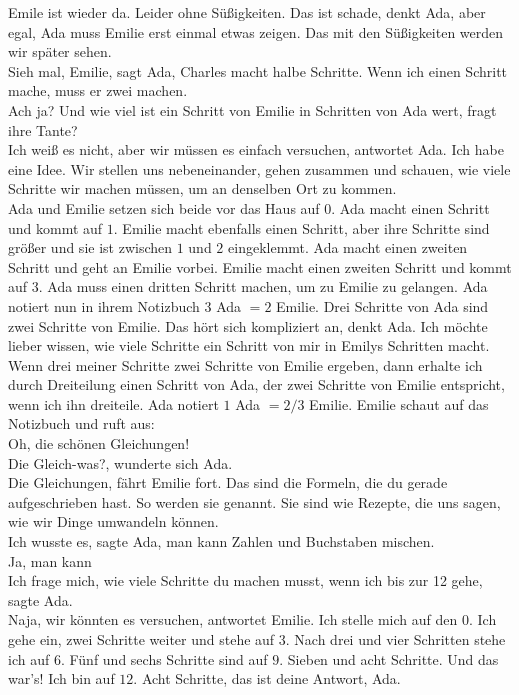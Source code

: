 Emile ist wieder da. Leider ohne Süßigkeiten. Das ist schade, denkt Ada, aber egal, Ada muss Emilie erst einmal etwas zeigen. Das mit den Süßigkeiten werden wir später sehen.\\
\frqq{}Sieh mal, Emilie\flqq{}, sagt Ada, \frqq{}Charles macht halbe Schritte. Wenn ich einen Schritt mache, muss er zwei machen.\flqq{}\\
\frqq{}Ach ja? Und wie viel ist ein Schritt von Emilie in Schritten von Ada wert, fragt ihre Tante?\flqq{}\\
\frqq{}Ich weiß es nicht, aber wir müssen es einfach versuchen\flqq{}, antwortet Ada. \frqq{}Ich habe eine Idee. Wir stellen uns nebeneinander, gehen zusammen und schauen, wie viele Schritte wir machen müssen, um an denselben Ort zu kommen.\flqq{}\\
Ada und Emilie setzen sich beide vor das Haus auf $0$. Ada macht einen Schritt und kommt auf $1$. Emilie macht ebenfalls einen Schritt, aber ihre Schritte sind größer und sie ist zwischen $1$ und $2$ eingeklemmt.
Ada macht einen zweiten Schritt und geht an Emilie vorbei. Emilie macht einen zweiten Schritt und kommt auf $3$.  Ada muss einen dritten Schritt machen, um zu Emilie zu gelangen.
Ada notiert nun in ihrem Notizbuch $3$ Ada $= 2$ Emilie. Drei Schritte von Ada sind zwei Schritte von Emilie. Das hört sich kompliziert an, denkt Ada. Ich möchte lieber wissen, wie viele Schritte ein Schritt von mir in Emilys Schritten macht. Wenn drei meiner Schritte zwei Schritte von Emilie ergeben, dann erhalte ich durch Dreiteilung einen Schritt von Ada, der zwei Schritte von Emilie entspricht, wenn ich ihn dreiteile. Ada notiert $1$ Ada $= 2/3$ Emilie.
Emilie schaut auf das Notizbuch und ruft aus: \\
\frqq{}Oh, die schönen Gleichungen!\flqq{}\\
\frqq{}Die Gleich-was?\flqq{}, wunderte sich Ada.\\
\frqq{}Die Gleichungen\flqq{}, fährt Emilie fort. \frqq{}Das sind die Formeln, die du gerade aufgeschrieben hast. So werden sie genannt. Sie sind wie Rezepte, die uns sagen, wie wir Dinge umwandeln können.\flqq{}\\
\frqq{}Ich wusste es\flqq{}, sagte Ada, \frqq{}man kann Zahlen und Buchstaben mischen.\flqq{}\\
\frqq{}Ja, man kann\flqq{}\\
\frqq{}Ich frage mich, wie viele Schritte du machen musst, wenn ich bis zur 12 gehe\flqq{}, sagte Ada.\\
\frqq{}Naja, wir könnten es versuchen\flqq{}, antwortet Emilie. \frqq{}Ich stelle mich auf den $0$. Ich gehe ein, zwei Schritte weiter und stehe auf $3$. Nach drei und vier Schritten stehe ich auf $6$. Fünf und sechs Schritte sind auf $9$. Sieben und acht Schritte. Und das war's! Ich bin auf $12$. Acht Schritte, das ist deine Antwort, Ada.\flqq{}\\
